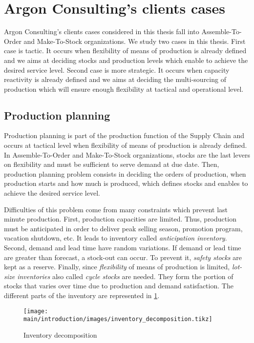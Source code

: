 \section{Argon Consulting's clients cases}


Argon Consulting's clients cases considered in this thesis fall into Assemble-To-Order and Make-To-Stock organizations.
We study two cases in this thesis.
First case is tactic.
It occurs when flexibility of means of production is already defined and we aims at deciding stocks and production levels which enable to achieve the desired service level.
Second case is more strategic.
It occurs when capacity reactivity is already defined and we aims at deciding the multi-sourcing of production which will ensure enough flexibility at tactical and operational level.


\subsection{Production planning}
\label{sec:business-context:argon:pdp}


Production planning is part of the production function of the Supply Chain and occurs at tactical level when flexibility of means of production is already defined.
In Assemble-To-Order and Make-To-Stock organizations, stocks are the last levers on flexibility and must be sufficient to serve demand at due date.
Then, production planning problem consists in deciding the orders of production, \ie when production starts and how much is produced, which defines stocks and enables to achieve the desired service level.


Difficulties of this problem come from many constraints which prevent last minute production.
First, production capacities are limited.
Thus, production must be anticipated in order to deliver peak selling season, promotion program, vacation shutdown, etc.
It leads to inventory called \emph{anticipation inventory}.
Second, demand and lead time have random variations.
If demand or lead time are greater than forecast, a stock-out can occur.
To prevent it, \emph{safety stocks} are kept as a reserve.
Finally, since \emph{flexibility} of means of production is limited, \emph{lot-size inventories} also called \emph{cycle stocks} are needed.
They form the portion of stocks that varies over time due to production and demand satisfaction.
The different parts of the inventory are represented in \cref{fig:inventory-decomposition}.
\begin{figure}[h]
  \centering
  \texttt{[image: main/introduction/images/inventory\_decomposition.tikz]}
  \caption{Inventory decomposition}
  \label{fig:inventory-decomposition}
\end{figure}


